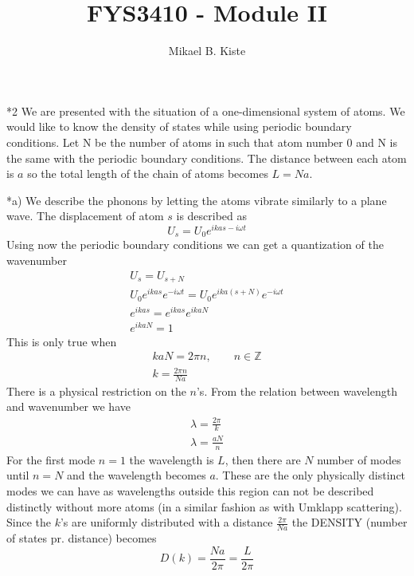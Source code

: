 \documentclass[a4paper]{article}
\author{Mikael B. Kiste}
\title{FYS3410 - Module II}
\begin{document}
\maketitle

\begin{section}*2
We are presented with the situation of a one-dimensional system of atoms. We would like to know the density of states while using periodic boundary conditions. Let N be the number of atoms in such that atom number 0 and N is the same with the periodic boundary conditions. The distance between each atom is $a$ so the total length of the chain of atoms becomes $L=Na$.
	\begin{subsection}*{a)}
		We describe the phonons by letting the atoms vibrate similarly to a plane wave. The displacement of atom $s$ is described as 
		$$ U_s = U_0 e^{ikas-i\omega t} $$
		Using now the periodic boundary conditions we can get a quantization of the wavenumber
		\begin{align*}
			U_s = U_{s+N}\\
			U_0e^{ikas}e^{-i\omega t} = U_0e^{ika(s+N)}e^{-i\omega t}\\
			e^{ikas} = e^{ikas}e^{ikaN}\\
			e^{ikaN} = 1
		\end{align*}
		This is only true when
		\begin{align*}
			kaN=2 \pi n,\qquad n\in \mathbb{Z}\\
			k = \frac{2\pi n}{Na}
		\end{align*}
		There is a physical restriction on the $n$'s. From the relation between wavelength and wavenumber we have
		\begin{align*}
			\lambda = \frac{2\pi}{k}\\
			\lambda = \frac{aN}{n}
		\end{align*}
		For the first mode $n=1$ the wavelength is $L$, then there are $N$ number of modes until $n=N$ and the wavelength becomes $a$. These are the only physically distinct modes we can have as wavelengths outside this region can not be described distinctly without more atoms (in a similar fashion as with Umklapp scattering).
		Since the $k$'s are uniformly distributed with a distance $\frac{2\pi}{Na}$ the DENSITY (number of states pr. distance) becomes
		$$D(k) = \frac{Na}{2\pi} = \frac{L}{2\pi}$$
	\end{subsection}
\end{section}
\end{document}
